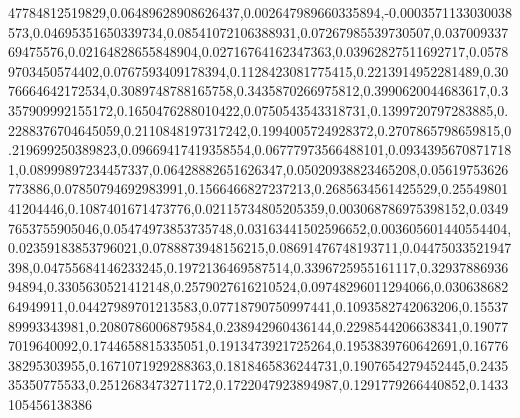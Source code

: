 47784812519829,0.06489628908626437,0.002647989660335894,-0.0003571133030038573,0.04695351650339734,0.08541072106388931,0.07267985539730507,0.03700933769475576,0.02164828655848904,0.02716764162347363,0.03962827511692717,0.05789703450574402,0.0767593409178394,0.1128423081775415,0.2213914952281489,0.3076664642172534,0.3089748788165758,0.3435870266975812,0.3990620044683617,0.3357909992155172,0.1650476288010422,0.0750543543318731,0.1399720797283885,0.2288376704645059,0.2110848197317242,0.1994005724928372,0.2707865798659815,0.219699250389823,0.09669417419358554,0.06777973566488101,0.09343956708717181,0.08999897234457337,0.06428882651626347,0.05020938823465208,0.05619753626773886,0.07850794692983991,0.1566466827237213,0.2685634561425529,0.2554980141204446,0.1087401671473776,0.02115734805205359,0.003068786975398152,0.03497653755905046,0.05474973853735748,0.03163441502596652,0.003605601440554404,0.02359183853796021,0.0788873948156215,0.08691476748193711,0.04475033521947398,0.04755684146233245,0.1972136469587514,0.3396725955161117,0.3293788693694894,0.3305630521412148,0.2579027616210524,0.09748296011294066,0.03063868264949911,0.04427989701213583,0.07718790750997441,0.1093582742063206,0.1553789993343981,0.2080786006879584,0.238942960436144,0.2298544206638341,0.190777019640092,0.1744658815335051,0.1913473921725264,0.1953839760642691,0.1677638295303955,0.1671071929288363,0.1818465836244731,0.1907654279452445,0.243535350775533,0.2512683473271172,0.1722047923894987,0.1291779266440852,0.1433105456138386
